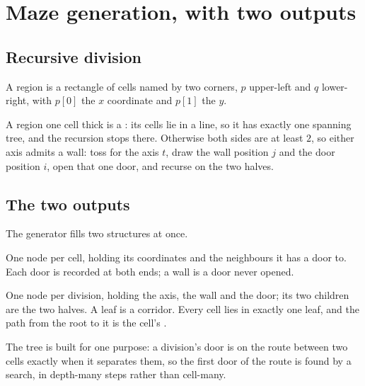 \section{Maze generation, with two outputs}
\label{sec:generation}

\subsection{Recursive division}

A region is a rectangle of cells named by two corners, $p$ upper-left and $q$
lower-right, with $p[0]$ the $x$ coordinate and $p[1]$ the $y$.

A region one cell thick is a : its cells lie in a line, so it
has exactly one spanning tree, and the recursion stops there. Otherwise both
sides are at least $2$, so either axis admits a wall: toss for the axis $t$,
draw the wall position $j$ and the door position $i$, open that one door, and
recurse on the two halves.

\subsection{The two outputs}

The generator fills two structures at once.

\begin{description}[leftmargin=*,style=nextline,itemsep=4pt]
  \item[The graph.] One node per cell, holding its coordinates and the
    neighbours it has a door to. Each door is recorded at both ends; a wall is
    a door never opened.
  \item[The binary tree.] One node per division, holding the axis, the wall and
    the door; its two children are the two halves. A leaf is a corridor. Every
    cell lies in exactly one leaf, and the path from the root to it is the
    cell's .
\end{description}

\begin{keypoint}
The tree is built for one purpose: a division's door is on the route between
two cells exactly when it separates them, so the first door of the route is
found by a  search, in depth-many steps rather
than cell-many.
\end{keypoint}



